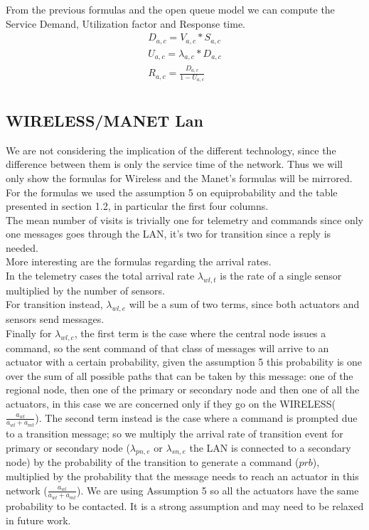 \documentclass[11pt]{article}
\begin{document}
From the previous formulas and the open queue model we can compute the Service Demand, Utilization factor and Response time.
\begin{equation}
	\begin{array}{l}
		D_{a, c} = V_{a, c} * S_{a, c} \\
		U_{a, c} = \lambda_{a, c} * D_{a, c} \\
		R_{a, c} = \frac{D_{a, c}}{1 - U_{a,c}} \\
	\end{array}
\end{equation}



\subsection{WIRELESS/MANET Lan}
We are not considering the implication of the different technology, since the difference between them is only the service time of the network. Thus we will only show the formulas for Wireless and the Manet's formulas will be mirrored.\\
For the formulas we used the assumption 5 on equiprobability and the table presented in section 1.2, in particular the first four columns.\\
The mean number of visits is trivially one for telemetry and commands since only one messages goes through the LAN, it's two for transition since a reply is needed.\\
More interesting are the formulas regarding the arrival rates.\\
In the telemetry cases the total arrival rate $\lambda_{wl, t}$ is the rate of a single sensor multiplied by the number of sensors.\\
For transition instead, $\lambda_{wl, e}$ will be a sum of two terms, since both actuators and sensors send messages.\\
Finally for $\lambda_{wl, c}$, the first term is the case where the central node issues a command, so the sent command of that class of messages will arrive to an actuator with a certain probability, given the assumption 5 this probability is one over the sum of all possible paths that can be taken by this message: one of the regional node, then one of the primary or secondary node and then one of all the actuators, in this case we are concerned only if they go on the WIRELESS($\frac{a_{wl}}{a_{wl}+a_{mt}}$). The second term instead is the case where a command is prompted due to a transition message; so we multiply the arrival rate of transition event for primary or secondary node ($\lambda_{pn,e}$ or $\lambda_{sn,e}$ the LAN is connected to a secondary node) by the probability of the transition to generate a command ($prb$), multiplied by the probability that the message needs to reach an actuator in this network ($\frac{a_{wl}}{a_{wl}+a_{mt}}$). We are using Assumption 5 so all the actuators have the same probability to be contacted. It is a strong assumption and may need to be relaxed in future work.\\
\end{document}
